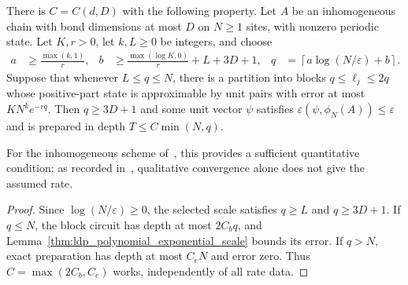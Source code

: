 \begin{lemma}
    \label{thm:ldp_explicit_usable_scale}
    \leanok
    There is $C=C(d,D)$ with the following property. Let $A$ be an
    inhomogeneous chain with bond dimensions at most $D$ on $N\ge1$ sites,
    with nonzero periodic state. Let $K,r>0$, let $k,L\ge0$ be integers, and
    choose
    \begin{align}
        a & \ge\frac{\max(k,1)}r,
          & b                     & \ge\frac{\max(\log K,0)}r+L+3D+1,
          & q                     & =\left\lceil a\log(N/\varepsilon)+b\right\rceil .
        \label{eq:ldp_explicit_scale}
    \end{align}
    Suppose that whenever $L\le q\le N$, there is a partition into blocks
    $q\le\ell_j\le2q$ whose positive-part state is approximable by unit
    pairs with error at most $KN^ke^{-rq}$. Then $q\ge3D+1$ and some unit
    vector $\psi$ satisfies $\varepsilon(\psi,\phi_N(A))\le\varepsilon$
    and is prepared in depth $T\le C\min(N,q)$.

    For the inhomogeneous scheme of~\cite{Malz2024Preparation}, this provides
    a sufficient quantitative condition; as recorded
    in~\cite{gap:mswc24_inhomogeneous_scope}, qualitative convergence alone
    does not give the assumed rate.
\end{lemma}
\begin{proof}
    \leanok
    Since $\log(N/\varepsilon)\ge0$, the selected scale satisfies
    $q\ge L$ and $q\ge3D+1$. If $q\le N$, the block circuit has depth
    at most $2C_bq$, and
    Lemma~\ref{thm:ldp_polynomial_exponential_scale} bounds its error.
    If $q>N$, exact preparation has depth at most $C_eN$ and error zero.
    Thus $C=\max(2C_b,C_e)$ works, independently of all rate data.
\end{proof}

